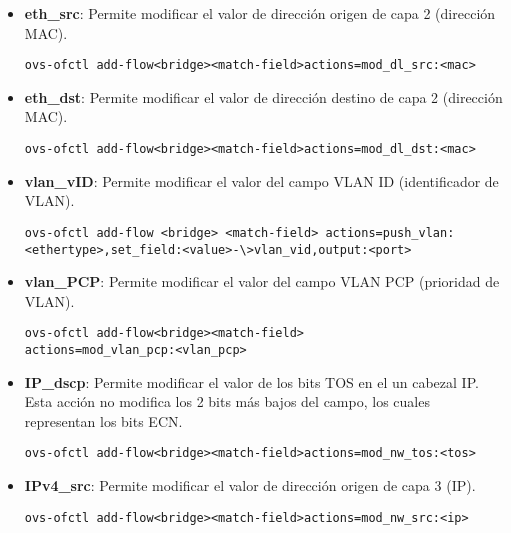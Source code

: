 \begin{itemize}

\item \textbf{eth\_src}: Permite modificar el valor de direcci\'on origen de capa 2 (direcci\'on MAC).

\begin{center}
\texttt{ovs-ofctl add-flow<bridge><match-field>actions=mod\_dl\_src:<mac>}
\end{center}

\item \textbf{eth\_dst}: Permite modificar el valor de direcci\'on destino de capa 2 (direcci\'on MAC).

\begin{center}
\texttt{ovs-ofctl add-flow<bridge><match-field>actions=mod\_dl\_dst:<mac>}
\end{center}

\item \textbf{vlan\_vID}: Permite modificar el valor del campo VLAN ID (identificador de VLAN).
                         
\begin{center}
\texttt{ovs-ofctl add-flow <bridge> <match-field> actions=push\_vlan:<ethertype>,set\_field:<value>-\textbackslash >vlan\_vid,output:<port>}
\end{center}

\item \textbf{vlan\_PCP}: Permite modificar el valor del campo VLAN PCP (prioridad de VLAN).

\begin{center}
\texttt{ovs-ofctl add-flow<bridge><match-field> \\ 
actions=mod\_vlan\_pcp:<vlan\_pcp>}
\end{center}

\item \textbf{IP\_dscp}: Permite modificar el valor de los bits TOS en el un cabezal IP. Esta acci\'on no modifica los 2 bits m\'as bajos del campo, los cuales representan los bits ECN.

\begin{center}
\texttt{ovs-ofctl add-flow<bridge><match-field>actions=mod\_nw\_tos:<tos>}
\end{center}

\item \textbf{IPv4\_src}: Permite modificar el valor de direcci\'on origen de capa 3 (IP).

\begin{center}
\texttt{ovs-ofctl add-flow<bridge><match-field>actions=mod\_nw\_src:<ip>}
\end{center}


\end{itemize}
